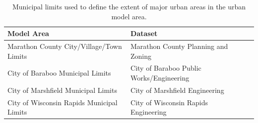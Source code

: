 \begin{table}
\begin{center}
	\caption{Municipal limits used to define the extent of major urban areas in the urban model area.}
	\begin{tabular}{l lc}
	\hline
		Model Area	      &	Dataset \\
	\hline	\hline
		Marathon County City/Village/Town Limits        &	Marathon County Planning and Zoning \\
		City of Baraboo Municipal Limits  &	City of Baraboo Public Works/Engineering	 	\\
		City of Marshfield Municipal Limits &	City of Marshfield Engineering \\
		City of Wisconsin Rapids Municipal Limits & City of Wisconsin Rapids Engineering\\
		\hline
	\end{tabular}
\label{tab:specific_urban_areas_limits}
\end{center}
\end{table}
